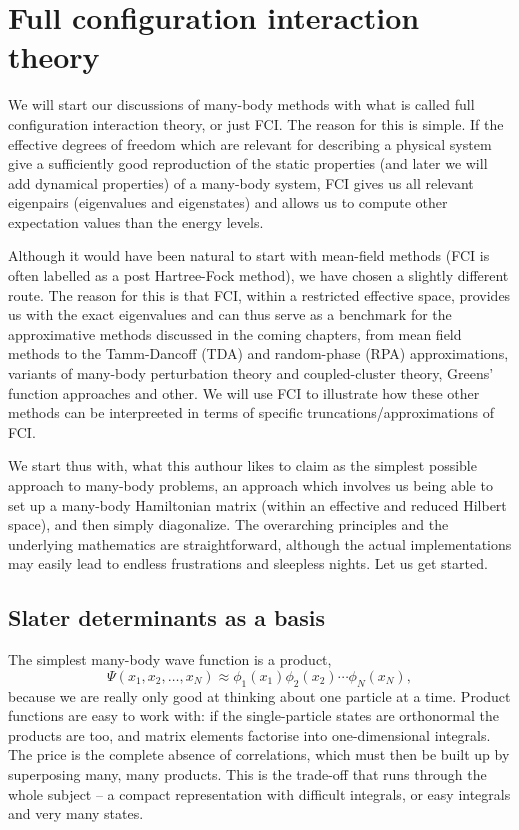 \chapter{Full configuration interaction theory}
\label{chap:fci}

We will start our discussions of many-body methods with what is called
full configuration interaction theory, or just FCI.  The reason for
this is simple. If the effective degrees of freedom which are relevant
for describing a physical system give a sufficiently good reproduction
of the static properties (and later we will add dynamical properties)
of a many-body system, FCI gives us all relevant eigenpairs
(eigenvalues and eigenstates) and allows us to compute other
expectation values than the energy levels.

Although it would have been natural to start with mean-field methods
(FCI is often labelled as a post Hartree-Fock method), we have chosen
a slightly different route. The reason for this is that FCI,
within a restricted effective space, provides us with the exact
eigenvalues and can thus serve as a benchmark for the approximative
methods discussed in the coming chapters, from mean field methods to
the Tamm-Dancoff (TDA) and random-phase (RPA) approximations, variants of many-body
perturbation theory and coupled-cluster theory, Greens' function
approaches and other. We will use FCI to illustrate how these other
methods can be interpreeted in terms of specific truncations/approximations of
FCI.

We start thus with, what this authour likes to claim as the simplest
possible approach to many-body problems, an approach which involves us
being able to set up a many-body Hamiltonian matrix (within an
effective and reduced Hilbert space), and then simply diagonalize. The
overarching principles and the underlying mathematics are
straightforward, although the actual implementations may easily lead
to endless frustrations and sleepless nights. Let us get started.

\section{Slater determinants as a basis}
\label{sec:cibasis}

The simplest many-body wave function is a product,
\begin{equation}
  \Psi(x_1,x_2,\dots,x_N) \approx
    \phi_1(x_1)\phi_2(x_2)\cdots\phi_N(x_N),
  \label{eq:5-product}
\end{equation}
because we are really only good at thinking about one particle at a time.
Product functions are easy to work with: if the single-particle states are
orthonormal the products are too, and matrix elements factorise into
one-dimensional integrals.  The price is the complete absence of correlations,
which must then be built up by superposing many, many products.  This is the
trade-off that runs through the whole subject -- a compact representation with
difficult integrals, or easy integrals and very many states.

